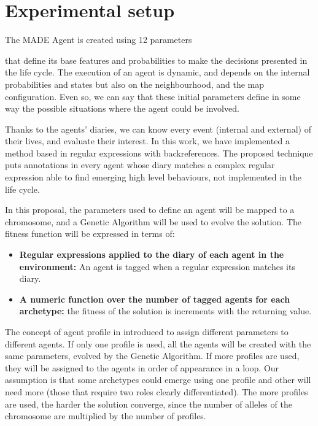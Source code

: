 \documentclass[runningheads]{llncs}
\begin{document}

\section{Experimental setup}
\label{sec:experimentalsetup}

The MADE Agent is created using 12 parameters 

that define its base features and probabilities to make the decisions presented in the life cycle. The execution of an agent is dynamic, and depends on the internal probabilities and states but also on the neighbourhood, and the map configuration. Even so, we can say that these initial parameters define in some way the possible situations where the agent could be involved.

Thanks to the agents' diaries, we can know every event (internal and external) of their lives, and evaluate their interest. In this work, we have implemented a method based in regular expressions with backreferences. The proposed technique puts annotations in every agent whose diary matches a complex regular expression able to find emerging high level behaviours, not implemented in the life cycle. 

In this proposal, the parameters used to define an agent will be mapped to a chromosome, and a Genetic Algorithm will be used to evolve the solution. The fitness function will be expressed in terms of:

\begin{itemize}
\item \textbf{Regular expressions applied to the diary of each agent in the environment:} An agent is tagged when a regular expression matches its diary.
\item \textbf{A numeric function over the number of tagged agents for each archetype:} the fitness of the solution is increments with the returning value.
\end{itemize}

The concept of agent profile in introduced to assign different parameters to different agents. If only one profile is used, all the agents will be created with the same parameters, evolved by the Genetic Algorithm. If more profiles are used, they will be assigned to the agents in order of appearance in a loop. Our assumption is that some archetypes could emerge using one profile and other will need more (those that require two roles clearly differentiated). The more profiles are used, the harder the solution converge, since the number of alleles of the chromosome are multiplied by the number of profiles.
\end{document}
